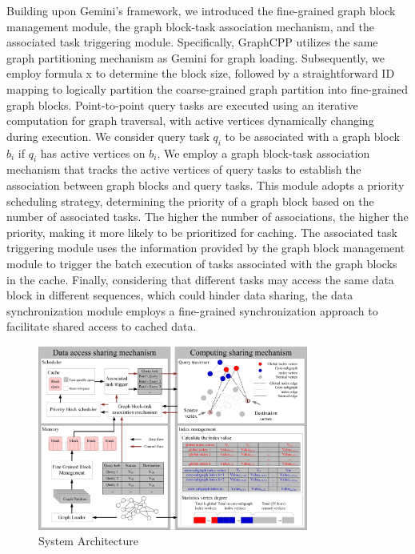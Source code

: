 \documentclass[lettersize,journal]{IEEEtran} %
\begin{document}
Building upon Gemini’s framework, we introduced the fine-grained graph block management module, the graph block-task association mechanism, and the associated task triggering module. Specifically, GraphCPP utilizes the same graph partitioning mechanism as Gemini for graph loading. Subsequently, we employ formula x to determine the block size, followed by a straightforward ID mapping to logically partition the coarse-grained graph partition into fine-grained graph blocks. Point-to-point query tasks are executed using an iterative computation for graph traversal, with active vertices dynamically changing during execution. We consider query task $q_i$ to be associated with a graph block $b_i$ if $q_i$ has active vertices on $b_i$. We employ a graph block-task association mechanism that tracks the active vertices of query tasks to establish the association between graph blocks and query tasks. This module adopts a priority scheduling strategy, determining the priority of a graph block based on the number of associated tasks. The higher the number of associations, the higher the priority, making it more likely to be prioritized for caching. The associated task triggering module uses the information provided by the graph block management module to trigger the batch execution of tasks associated with the graph blocks in the cache. Finally, considering that different tasks may access the same data block in different sequences, which could hinder data sharing, the data synchronization module employs a fine-grained synchronization approach to facilitate shared access to cached data.


\begin{figure}[!t]
\centering
\includegraphics[width=3.5in]{系统架构}
\caption{System Architecture}  
\label{系统架构}
\end{figure}
 
\end{document}
